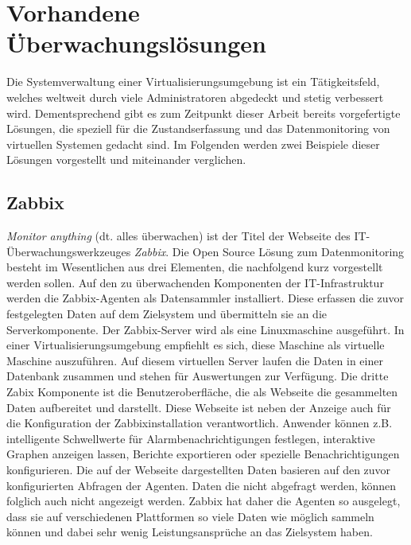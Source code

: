 \chapter{Vorhandene Überwachungslösungen}\label{chap:monitor}
Die Systemverwaltung einer Virtualisierungsumgebung ist ein Tätigkeitsfeld, welches weltweit durch viele Administratoren abgedeckt und stetig verbessert wird. Dementsprechend gibt es zum Zeitpunkt dieser Arbeit bereits vorgefertigte Lösungen, die speziell für die Zustandserfassung und das Datenmonitoring von virtuellen Systemen gedacht sind. Im Folgenden werden zwei Beispiele dieser Lösungen vorgestellt und miteinander verglichen.
\section{Zabbix}
\textit{Monitor anything} (dt. alles überwachen) ist der Titel der Webseite des IT- Überwachungswerkzeuges \textit{Zabbix}. Die Open Source Lösung zum Datenmonitoring besteht im Wesentlichen aus drei Elementen, die nachfolgend kurz vorgestellt werden sollen. Auf den zu überwachenden Komponenten der IT-Infrastruktur werden die Zabbix-Agenten als Datensammler installiert. Diese erfassen die zuvor festgelegten Daten auf dem Zielsystem und übermitteln sie an die Serverkomponente. Der Zabbix-Server wird als eine Linuxmaschine ausgeführt. In einer Virtualisierungsumgebung empfiehlt es sich, diese Maschine als virtuelle Maschine auszuführen. Auf diesem virtuellen Server laufen die Daten in einer Datenbank zusammen und stehen für Auswertungen zur Verfügung. Die dritte Zabix Komponente ist die Benutzeroberfläche, die als Webseite die gesammelten Daten aufbereitet und darstellt. Diese Webseite ist neben der Anzeige auch für die Konfiguration der Zabbixinstallation verantwortlich. Anwender können z.B. intelligente Schwellwerte für Alarmbenachrichtigungen festlegen, interaktive Graphen anzeigen lassen, Berichte exportieren oder spezielle Benachrichtigungen konfigurieren. Die auf der Webseite dargestellten Daten basieren auf den zuvor konfigurierten Abfragen der Agenten. Daten die nicht abgefragt werden, können folglich auch nicht angezeigt werden. Zabbix hat daher die Agenten so ausgelegt, dass sie auf verschiedenen Plattformen so viele Daten wie möglich sammeln können und dabei sehr wenig Leistungsansprüche an das Zielsystem haben. \cite{ZabbixSIA2021,cubewerkGmbH2017}
